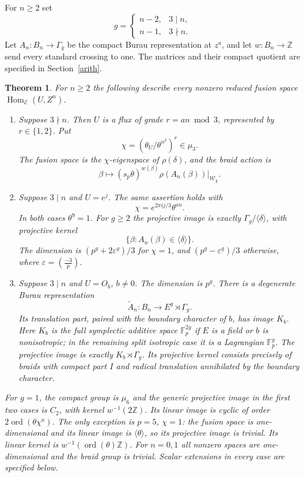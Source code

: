 \documentclass[11pt]{amsart}
\newtheorem{theorem}{Theorem}[section]
\newcommand{\Fp}{\mathbb F_p}
\newcommand{\Hom}{\operatorname{Hom}}
\begin{document}
For $n\ge2$ set
\[
g=\begin{cases}n-2,&3\mid n,\\n-1,&3\nmid n.\end{cases}
\]
Let $A_n:B_n\to\Gamma_g$ be the compact Burau representation at
$z^a$, and let $w:B_n\to\mathbb Z$ send every standard crossing to one.
The matrices and their compact quotient are specified in Section~\ref{arith}.

\begin{theorem}\label{main}
For $n\ge2$ the following describe every nonzero reduced fusion space
$\Hom_{\mathcal E}(U,Z^n)$.
\begin{enumerate}
\item Suppose $3\nmid n$. Then $U$ is a flux of grade
$r=an\bmod3$, represented by $r\in\{1,2\}$. Put
\[
\chi=(\theta_U/\theta^{n^2})^r\in\mu_3.
\]
The fusion space is the $\chi$-eigenspace of $\rho(\delta)$, and the
braid action is
\begin{equation}\label{closedaction}
\beta\longmapsto (s_p\theta)^{w(\beta)}
\rho(A_n(\beta))\big|_{\mathscr W_\chi}.
\end{equation}
\item Suppose $3\mid n$ and $U=e^j$. The same assertion holds with
\[
\chi=e^{2\pi i j/3}\theta^{an}.
\]
In both cases $\theta^9=1$. For $g\ge2$ the projective image is exactly
$\Gamma_g/\langle\delta\rangle$, with projective kernel
\[
\{\beta:A_n(\beta)\in\langle\delta\rangle\}.
\]
The dimension is $(p^g+2\varepsilon^g)/3$ for $\chi=1$, and
$(p^g-\varepsilon^g)/3$ otherwise, where $\varepsilon=(\frac{-3}p)$.
\item Suppose $3\mid n$ and $U=O_b$, $b\ne0$. The dimension is $p^g$.
There is a degenerate Burau representation
\[
\widetilde A_n:B_n\longrightarrow E^g\rtimes\Gamma_g.
\]
Its translation part, paired with the boundary character of $b$, has
image $K_b$. Here $K_b$ is the full symplectic additive space $\Fp^{2g}$
if $E$ is a field or $b$ is nonisotropic; in the remaining split
isotropic case it is a Lagrangian $\Fp^g$.
The projective image is exactly $K_b\rtimes\Gamma_g$.
Its projective kernel consists precisely of braids with compact part
$I$ and radical translation annihilated by the boundary character.
\end{enumerate}
For $g=1$, the compact group is $\mu_6$ and the generic projective
image in the first two cases is $C_2$, with kernel $w^{-1}(2\mathbb Z)$.
Its linear image is cyclic of order
$2\operatorname{ord}(\theta\chi^a)$. The only exception is
$p=5$, $\chi=1$: the fusion space is one-dimensional and its linear
image is $\langle\theta\rangle$, so its projective image is trivial.
Its linear kernel is $w^{-1}(\operatorname{ord}(\theta)\mathbb Z)$.
For $n=0,1$ all nonzero spaces are one-dimensional and the braid group
is trivial. Scalar extensions in every case are specified below.
\end{theorem}
\end{document}

